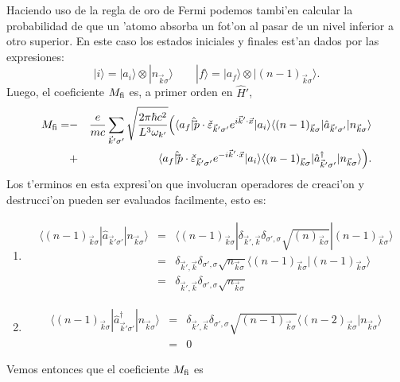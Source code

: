 Haciendo uso de la regla de oro de Fermi podemos tambi'en calcular la
probabilidad de que un 'atomo absorba un fot'on al pasar de un nivel inferior a
otro superior. En este caso los estados iniciales y finales est'an dados por las
expresiones:
\begin{equation}
|i\rangle =|a_i\rangle \otimes|n_{\vec{k}\sigma}\rangle 
\qquad
|f\rangle =|a_f\rangle \otimes|(n-1)_{\vec{k}\sigma}\rangle .
\end{equation}
Luego, el coeficiente $M_{\rm fi}$ es, a primer orden en $\hat{H}'$,
\begin{eqnarray}
M_{\rm fi}=&-&\frac{e}{mc}\sum_{\vec{k}'\sigma'}\sqrt{\frac{2\pi\hbar
c^2}{L^3\omega_{k'}}}\Big(\langle
a_f|{\hat\vec{p}}\cdot\check{\varepsilon}_{\vec{k}'\sigma'}e^{i\vec{k}'\cdot\vec
{x}}|a_i\rangle \langle (n-1)_{\vec{k}\sigma}|{\hat
a}_{\vec{k}'\sigma'}|n_{\vec{k}\sigma}\rangle 
\nonumber\\
&+&
\langle
a_f|{\hat\vec{p}}\cdot\check{\varepsilon}_{\vec{k}'\sigma'}e^{-i\vec{k}
'\cdot\vec
{x}}|a_i\rangle 
\langle (n-1)_{\vec{k}\sigma}|{\hat
a}_{\vec{k}'\sigma'}^\dagger |n_{\vec{k}\sigma}\rangle 
\Big).
\end{eqnarray} 
Los t'erminos en esta expresi'on que involucran operadores de creaci'on y
destrucci'on pueden ser evaluados facilmente, esto es:
\begin{enumerate}
\item \begin{eqnarray}
\langle (n-1)_{\vec{k}\sigma}|{\hat
a}_{\vec{k}'\sigma'}|n_{\vec{k}\sigma}\rangle &=&
\langle
(n-1)_{\vec{k}\sigma}|\delta_{\vec{k}',\vec{k}}\delta_{\sigma',\sigma}\sqrt{(n)_
{\vec{k}\sigma}}
|(n-1)_{\vec{k}\sigma}\rangle 
\nonumber\\
&=&\delta_{\vec{k}',\vec{k}}\delta_{\sigma',\sigma}\sqrt{n_{\vec{k}\sigma}}
\langle (n-1)_{\vec{k}\sigma}|(n-1)_{\vec{k}\sigma}\rangle 
\nonumber\\
&=&\delta_{\vec{k}',\vec{k}}\delta_{\sigma',\sigma}\sqrt{n_{\vec{k}\sigma}}
\end{eqnarray}
\item \begin{eqnarray}
\langle (n-1)_{\vec{k}\sigma}|{\hat
a}_{\vec{k}'\sigma'}^\dagger |n_{\vec{k}\sigma}\rangle &=&
\delta_{\vec{k}',\vec{k}}\delta_{\sigma',\sigma}\sqrt{(n-1)_{\vec{k}\sigma}}
\langle (n-2)_{\vec{k}\sigma}|n_{\vec{k}\sigma}\rangle 
\nonumber\\
&=&0
\end{eqnarray}
\end{enumerate}
Vemos entonces que el coeficiente $M_{\rm fi}$ es
